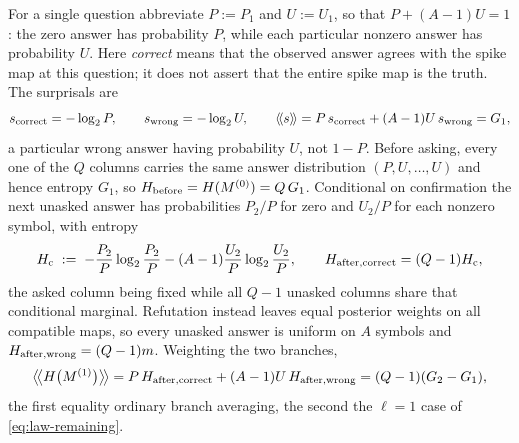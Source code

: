 \documentclass[11pt]{article}
\begin{document}
For a single question abbreviate $P := P_1$ and $U := U_1$, so that
$P + (A-1)U = 1$: the zero answer has probability $P$, while each
particular nonzero answer has probability $U$. Here \emph{correct}
means that the observed answer agrees with the spike map at this
question; it does not assert that the entire spike map is the truth.
The surprisals are
%
\begin{equation}
  s_{\rm correct} = -\log_2 P,
  \qquad
  s_{\rm wrong} = -\log_2 U,
  \qquad
  \langle\!\langle s\rangle\!\rangle = P\,s_{\rm correct} + (A-1)U\,s_{\rm wrong} = G_1 ,
  \label{eq:spikesurprisal}
\end{equation}
%
a particular wrong answer having probability $U$, not $1 - P$.
Before asking, every one of the $Q$ columns carries the same answer
distribution $(P, U, \ldots, U)$ and hence entropy $G_1$, so
$H_{\rm before} = H(M^{(0)}) = Q\,G_1$. Conditional on confirmation the
next unasked answer has probabilities $P_2/P$ for zero and $U_2/P$
for each nonzero symbol, with entropy
%
\begin{equation}
  H_{\rm c}
  \;:=\; -\frac{P_2}{P}\log_2\frac{P_2}{P}
  - (A-1)\frac{U_2}{P}\log_2\frac{U_2}{P},
  \qquad
  H_{\rm after, correct} = (Q-1)H_{\rm c},
  \label{eq:spikeHc}
\end{equation}
%
the asked column being fixed while all $Q-1$ unasked columns share
that conditional marginal. Refutation instead leaves equal posterior
weights on all compatible maps, so every unasked answer is uniform on
$A$ symbols and $H_{\rm after, wrong} = (Q-1)m$. Weighting the two
branches,
%
\begin{equation}
  \big\langle\!\big\langle H\big(M^{(1)}\big)\big\rangle\!\big\rangle
  = P\,H_{\rm after, correct} + (A-1)U\,H_{\rm after, wrong}
  = (Q-1)(G_2 - G_1),
  \label{eq:spikebranchavg}
\end{equation}
%
the first equality ordinary branch averaging, the second the
$\ell=1$ case of \eqref{eq:law-remaining}.
\end{document}
